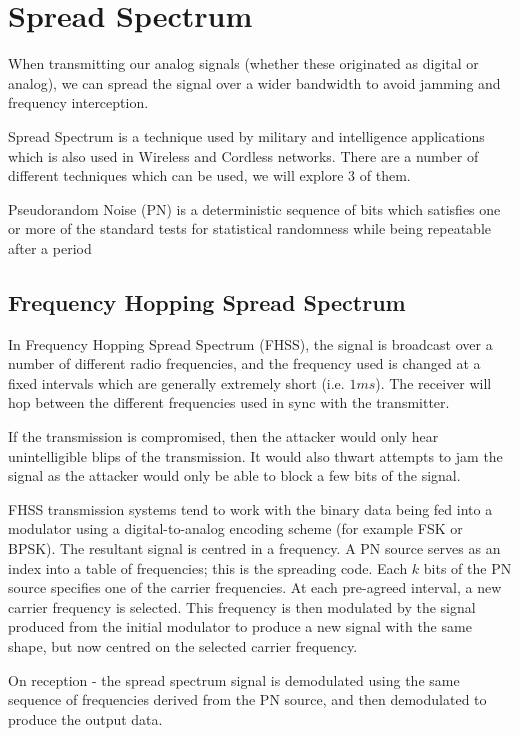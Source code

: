 \section{Spread Spectrum}
When transmitting our analog signals (whether these originated as digital or analog), we can spread the signal over a wider bandwidth to avoid jamming and frequency interception. 

Spread Spectrum is a technique used by military and intelligence applications which is also used in Wireless and Cordless networks. There are a number of different techniques which can be used, we will explore 3 of them. 

\begin{define}
    \item[Pseudorandom Noise] (PN) is a deterministic sequence of bits which satisfies one or more of the standard tests for statistical randomness while being repeatable after a period
\end{define}

\subsection{Frequency Hopping Spread Spectrum}
In Frequency Hopping Spread Spectrum (FHSS), the signal is broadcast over a number of different radio frequencies, and the frequency used is changed at a fixed intervals which are generally extremely short (i.e. $1 ms$). The receiver will hop between the different frequencies used in sync with the transmitter.

If the transmission is compromised, then the attacker would only hear unintelligible blips of the transmission. It would also thwart attempts to jam the signal as the attacker would only be able to block a few bits of the signal. 

FHSS transmission systems tend to work with the binary data being fed into a modulator using a digital-to-analog encoding scheme (for example FSK or BPSK). The resultant signal is centred in a frequency. A PN source serves as an index into a table of frequencies; this is the spreading code. Each $k$ bits of the PN source specifies one of the carrier frequencies. At each pre-agreed interval, a new carrier frequency is selected. This frequency is then modulated by the signal produced from the initial modulator to produce a new signal with the same shape, but now centred on the selected carrier frequency.

On reception - the spread spectrum signal is demodulated using the same sequence of frequencies derived from the PN source, and then demodulated to produce the output data. 


